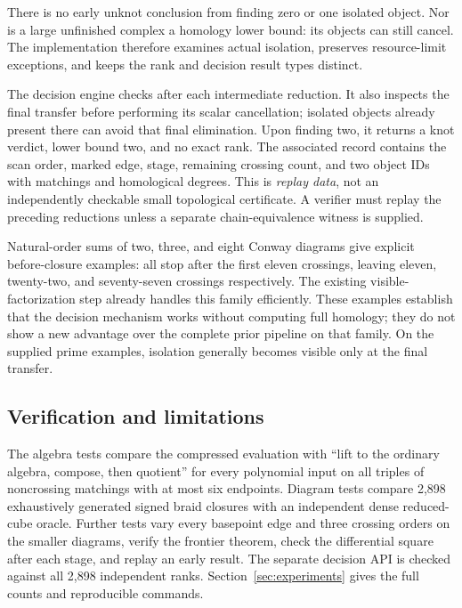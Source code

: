 There is no early unknot conclusion from finding zero or one isolated
object.  Nor is a large unfinished complex a homology lower bound: its
objects can still cancel.  The implementation therefore examines actual
isolation, preserves resource-limit exceptions, and keeps the rank and
decision result types distinct.

The decision engine checks after each intermediate reduction.  It also
inspects the final transfer before performing its scalar cancellation;
isolated objects already present there can avoid that final elimination.
Upon finding two, it returns a knot verdict, lower bound two, and no exact
rank.  The associated record contains the scan order, marked edge, stage,
remaining crossing count, and two object IDs with matchings and homological
degrees.  This is \emph{replay data}, not an independently checkable small
topological certificate.  A verifier must replay the preceding reductions
unless a separate chain-equivalence witness is supplied.

Natural-order sums of two, three, and eight Conway diagrams give explicit
before-closure examples: all stop after the first eleven crossings, leaving
eleven, twenty-two, and seventy-seven crossings respectively.  The existing
visible-factorization step already handles this family efficiently.  These
examples establish that the decision mechanism works without computing full
homology; they do not show a new advantage over the complete prior pipeline
on that family.  On the supplied prime examples, isolation generally becomes
visible only at the final transfer.

\subsection{Verification and limitations}

The algebra tests compare the compressed evaluation with ``lift to the
ordinary algebra, compose, then quotient'' for every polynomial input on all
triples of noncrossing matchings with at most six endpoints.  Diagram tests
compare 2,898 exhaustively generated signed braid closures with an independent
dense reduced-cube oracle.  Further tests vary every basepoint edge and three
crossing orders on the smaller diagrams, verify the frontier theorem,
check the differential square after each stage, and replay an early result.
The separate decision API is checked against all 2,898 independent ranks.
Section~\ref{sec:experiments} gives the full counts and reproducible commands.

